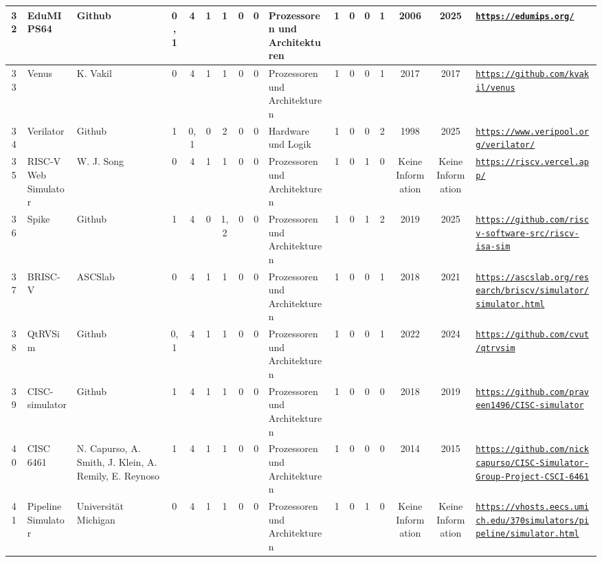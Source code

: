 \begin{landscape}
\begin{longtable}{|c|p{1cm}|p{1.3cm}|c|c|c|c|c|c|p{1.3cm}|c|c|c|c|c|c|p{2cm}|}
    32 & EduMIPS64 & Github & 0,1 & 4 & 1 & 1 & 0 & 0 & Prozessoren und Architekturen & 1 & 0 & 0 & 1 & 2006 & 2025 & \href{https://edumips.org/}{\nolinkurl{https://edumips.org/}} \\ \hline
    33 & Venus & K. Vakil & 0 & 4 & 1 & 1 & 0 & 0 & Prozessoren und Architekturen & 1 & 0 & 0 & 1 & 2017 & 2017 & \href{https://github.com/kvakil/venus}{\nolinkurl{https://github.com/kvakil/venus}} \\ \hline
    34 & Verilator & Github & 1 & 0,1 & 0 & 2 & 0 & 0 & Hardware und Logik & 1 & 0 & 0 & 2 & 1998 & 2025 & \href{https://www.veripool.org/verilator/}{\nolinkurl{https://www.veripool.org/verilator/}} \\ \hline
    35 & RISC-V Web Simulator & W. J. Song & 0 & 4 & 1 & 1 & 0 & 0 & Prozessoren und Architekturen & 1 & 0 & 1 & 0 & Keine Information & Keine Information & \href{https://riscv.vercel.app/}{\nolinkurl{https://riscv.vercel.app/}} \\ \hline
    36 & Spike & Github & 1 & 4 & 0 & 1,2 & 0 & 0 & Prozessoren und Architekturen & 1 & 0 & 1 & 2 & 2019 & 2025 & \href{https://github.com/riscv-software-src/riscv-isa-sim}{\nolinkurl{https://github.com/riscv-software-src/riscv-isa-sim}} \\ \hline
    37 & BRISC-V & ASCSlab & 0 & 4 & 1 & 1 & 0 & 0 & Prozessoren und Architekturen & 1 & 0 & 0 & 1 & 2018 & 2021 & \href{https://ascslab.org/research/briscv/simulator/simulator.html}{\nolinkurl{https://ascslab.org/research/briscv/simulator/simulator.html}} \\ \hline
    38 & QtRVSim & Github & 0,1 & 4 & 1 & 1 & 0 & 0 & Prozessoren und Architekturen & 1 & 0 & 0 & 1 & 2022 & 2024 & \href{https://github.com/cvut/qtrvsim}{\nolinkurl{https://github.com/cvut/qtrvsim}} \\ \hline
    39 & CISC-simulator & Github & 1 & 4 & 1 & 1 & 0 & 0 & Prozessoren und Architekturen & 1 & 0 & 0 & 0 & 2018 & 2019 & \href{https://github.com/praveen1496/CISC-simulator}{\nolinkurl{https://github.com/praveen1496/CISC-simulator}} \\ \hline
    40 & CISC 6461 & N. Capurso, A. Smith, J. Klein, A. Remily, E. Reynoso & 1 & 4 & 1 & 1 & 0 & 0 & Prozessoren und Architekturen & 1 & 0 & 0 & 0 & 2014 & 2015 & \href{https://github.com/nickcapurso/CISC-Simulator-Group-Project-CSCI-6461}{\nolinkurl{https://github.com/nickcapurso/CISC-Simulator-Group-Project-CSCI-6461}} \\ \hline
    41 & Pipeline Simulator & Universität Michigan & 0 & 4 & 1 & 1 & 0 & 0 & Prozessoren und Architekturen & 1 & 0 & 1 & 0 & Keine Information & Keine Information & \href{https://vhosts.eecs.umich.edu/370simulators/pipeline/simulator.html}{\nolinkurl{https://vhosts.eecs.umich.edu/370simulators/pipeline/simulator.html}} \\ \hline

\end{longtable}
\end{landscape}
